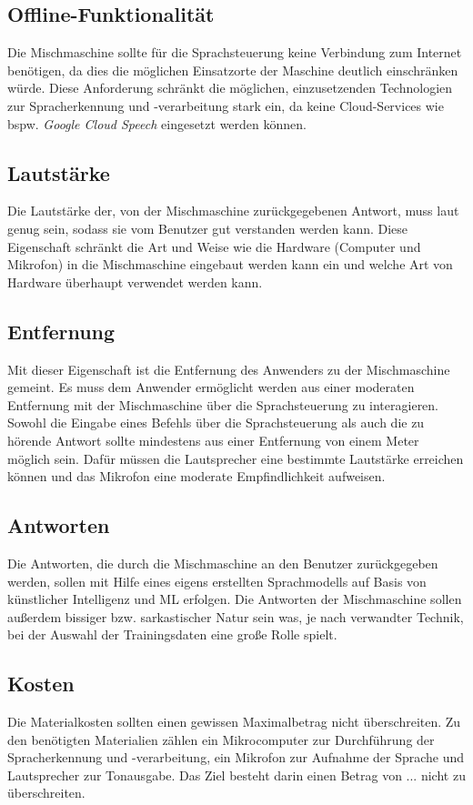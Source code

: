\subsection{Offline-Funktionalität}
Die Mischmaschine sollte für die Sprachsteuerung keine Verbindung zum Internet benötigen, da dies die möglichen Einsatzorte der Maschine deutlich einschränken würde.  Diese Anforderung schränkt die möglichen, einzusetzenden Technologien zur Spracherkennung und -verarbeitung stark ein, da keine Cloud-Services wie bspw. \textit{Google Cloud Speech} eingesetzt werden können.
\subsection{Lautstärke}
Die Lautstärke der, von der Mischmaschine zurückgegebenen Antwort, muss laut genug sein, sodass sie vom Benutzer gut verstanden werden kann. Diese Eigenschaft schränkt die Art und Weise wie die Hardware (Computer und Mikrofon) in die Mischmaschine eingebaut werden kann ein und welche Art von Hardware überhaupt verwendet werden kann.
\subsection{Entfernung}
Mit dieser Eigenschaft ist die Entfernung des Anwenders zu der Mischmaschine gemeint. Es muss dem Anwender ermöglicht werden aus einer moderaten Entfernung mit der Mischmaschine über die Sprachsteuerung zu interagieren. Sowohl die Eingabe eines Befehls über die Sprachsteuerung als auch die zu hörende Antwort sollte mindestens aus einer Entfernung von einem Meter möglich sein. Dafür müssen die Lautsprecher eine bestimmte Lautstärke erreichen können und das Mikrofon eine moderate Empfindlichkeit aufweisen.
\subsection{Antworten}
Die Antworten, die durch die Mischmaschine an den Benutzer zurückgegeben werden, sollen mit Hilfe eines eigens erstellten Sprachmodells auf Basis von künstlicher Intelligenz und \ac{ML} erfolgen. Die Antworten der Mischmaschine sollen außerdem bissiger bzw. sarkastischer Natur sein was, je nach verwandter Technik, bei der Auswahl der Trainingsdaten eine große Rolle spielt.  
\subsection{Kosten}
Die Materialkosten sollten einen gewissen Maximalbetrag nicht überschreiten. Zu den benötigten Materialien zählen ein Mikrocomputer zur Durchführung der Spracherkennung und -verarbeitung, ein Mikrofon zur Aufnahme der Sprache und Lautsprecher zur Tonausgabe. Das Ziel besteht darin einen Betrag von ... nicht zu überschreiten.

